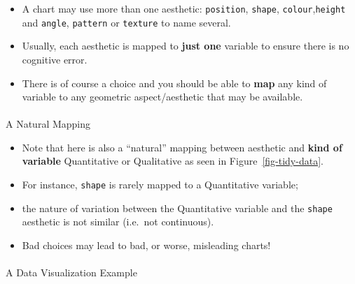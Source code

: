\documentclass[
  letterpaper,
  DIV=11,
  numbers=noendperiod]{scrartcl}
\makeatletter
\let\oldparagraph\paragraph
\renewcommand{\paragraph}{
    \@ifstar
      \xxxParagraphStar
      \xxxParagraphNoStar
  }
\newcommand{\xxxParagraphStar}[1]{\oldparagraph*{#1}\mbox{}}
\newcommand{\xxxParagraphNoStar}[1]{\oldparagraph{#1}\mbox{}}
\providecommand{\tightlist}{%
  \setlength{\itemsep}{0pt}\setlength{\parskip}{0pt}}
\makeatother
\begin{document}
\begin{itemize}
\tightlist
\item
  A chart may use more than one aesthetic: \texttt{position},
  \texttt{shape}, \texttt{colour},\texttt{height} and \texttt{angle},
  \texttt{pattern} or \texttt{texture} to name several.
\item
  Usually, each aesthetic is mapped to \textbf{just one} variable to
  ensure there is no cognitive error.
\item
  There is of course a choice and you should be able to \textbf{map} any
  kind of variable to any geometric aspect/aesthetic that may be
  available.
\end{itemize}

\paragraph{A Natural Mapping}\label{a-natural-mapping}

\begin{itemize}
\tightlist
\item
  Note that here is also a ``natural'' mapping between aesthetic and
  \textbf{kind of variable} Quantitative or Qualitative as seen in
  Figure~\ref{fig-tidy-data}.
\item
  For instance, \texttt{shape} is rarely mapped to a Quantitative
  variable;
\item
  the nature of variation between the Quantitative variable and the
  \texttt{shape} aesthetic is not similar (i.e.~not continuous).
\item
  Bad choices may lead to bad, or worse, misleading charts!
\end{itemize}

\paragraph{A Data Visualization
Example}\label{a-data-visualization-example}
\end{document}
